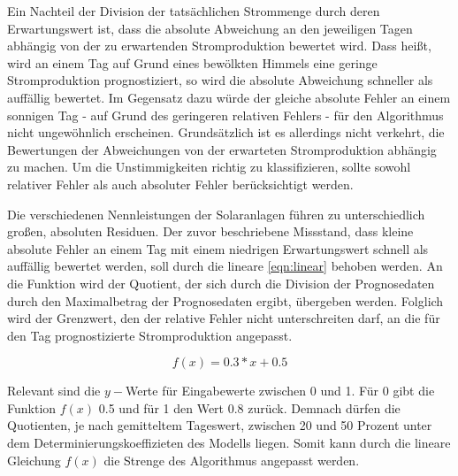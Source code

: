 \documentclass[12pt, a4paper]{article}
\begin{document}
Ein Nachteil der Division der tatsächlichen Strommenge durch deren Erwartungswert ist, dass die absolute Abweichung an den jeweiligen Tagen abhängig von der zu erwartenden Stromproduktion bewertet wird. Dass heißt, wird an einem Tag auf Grund eines bewölkten Himmels eine geringe Stromproduktion prognostiziert, so wird die absolute Abweichung schneller als auffällig bewertet. Im Gegensatz dazu würde der gleiche absolute Fehler an einem sonnigen Tag - auf Grund des geringeren relativen Fehlers - für den Algorithmus nicht ungewöhnlich erscheinen. Grundsätzlich ist es allerdings nicht verkehrt, die Bewertungen der Abweichungen von der erwarteten Stromproduktion abhängig zu machen. Um die Unstimmigkeiten richtig zu klassifizieren, sollte sowohl relativer Fehler als auch absoluter Fehler berücksichtigt werden.  

Die verschiedenen Nennleistungen der Solaranlagen führen zu unterschiedlich großen, absoluten Residuen. Der zuvor beschriebene Missstand, dass kleine absolute Fehler an einem Tag mit einem niedrigen Erwartungswert schnell als auffällig bewertet werden, soll durch die lineare \autoref{eqn:linear} behoben werden. An die Funktion wird der Quotient, der sich durch die Division der Prognosedaten durch den Maximalbetrag der Prognosedaten ergibt, übergeben werden. Folglich wird der Grenzwert, den der relative Fehler nicht unterschreiten darf, an die für den Tag prognostizierte Stromproduktion angepasst.

\begin{equation}
\label{eqn:linear}
f(x)=0.3*x+0.5
\end{equation}

Relevant sind die $y-$Werte für Eingabewerte zwischen 0 und 1. Für 0 gibt die Funktion $f(x)$ 0.5 und für 1 den Wert 0.8 zurück. Demnach dürfen die Quotienten, je nach gemitteltem Tageswert, zwischen 20 und 50 Prozent unter dem Determinierungskoeffizieten des Modells liegen. Somit kann durch die lineare Gleichung $f(x)$ die Strenge des Algorithmus angepasst werden.

\newpage
\end{document}
